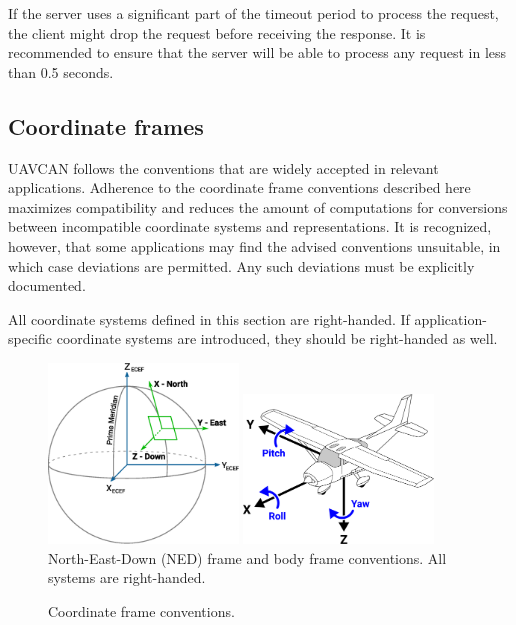 If the server uses a significant part of the timeout period to process the request,
the client might drop the request before receiving the response.
It is recommended to ensure that the server will be able to process any request in less than 0.5 seconds.

\subsection{Coordinate frames}

UAVCAN follows the conventions that are widely accepted in relevant applications.
Adherence to the coordinate frame conventions described here maximizes compatibility and
reduces the amount of computations for conversions between incompatible coordinate systems and
representations.
It is recognized, however, that some applications may find the advised conventions unsuitable,
in which case deviations are permitted.
Any such deviations must be explicitly documented.

All coordinate systems defined in this section are right-handed.
If application-specific coordinate systems are introduced, they should be right-handed as well.

\begin{figure}[hbt]
    \centering
	\includegraphics[width=0.45\textwidth]{application_layer/NED_ECEF}
    \includegraphics[width=0.45\textwidth]{application_layer/aircraft_principal_axes}
    North-East-Down (NED) frame and body frame conventions. All systems are right-handed.
    \caption{
        Coordinate frame conventions.
        \label{fig:application_coordinate_frame_conventions}
    }
\end{figure}

